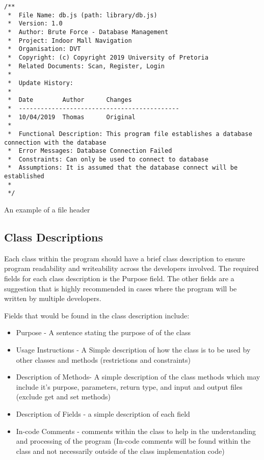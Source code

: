 \documentclass{article}
\begin{document}
    
\begin{lstlisting}
/**
 *  File Name: db.js (path: library/db.js)
 *  Version: 1.0
 * 	Author: Brute Force - Database Management
 * 	Project: Indoor Mall Navigation
 * 	Organisation: DVT
 *  Copyright: (c) Copyright 2019 University of Pretoria
 *  Related Documents: Scan, Register, Login
 * 	
 * 	Update History:
 * 
 *  Date		Author		Changes
 * 	--------------------------------------------
 * 	10/04/2019 	Thomas		Original
 * 
 * 	Functional Description: This program file establishes a database connection with the database
 * 	Error Messages: Database Connection Failed
 * 	Constraints: Can only be used to connect to database
 * 	Assumptions: It is assumed that the database connect will be established
 * 
 */
\end{lstlisting}
An example of a file header

\subsection{Class Descriptions}

Each class within the program should have a brief class description to ensure program readability and writeability across the developers involved. The required fields for each class description is the Purpose field. The other fields are a suggestion that is highly recommended in cases where the program will be written by multiple developers. \cite{kung}

Fields that would be found in the class description include:

\begin{itemize}
\item Purpose - A sentence stating the purpose of of the class
\item Usage Instructions - A Simple description of how the class is to be used by other classes and methods (restrictions and constraints)
\item Description of Methods- A simple description of the class methods which may include it's purpose, parameters, return type, and input and output files (exclude get and set methods)
\item Description of Fields - a simple description of each field
\item In-code Comments - comments within the class to help in the understanding and processing of the program (In-code comments will be found within the class and not necessarily outside of the class implementation code)

\end{itemize}
\end{document}
